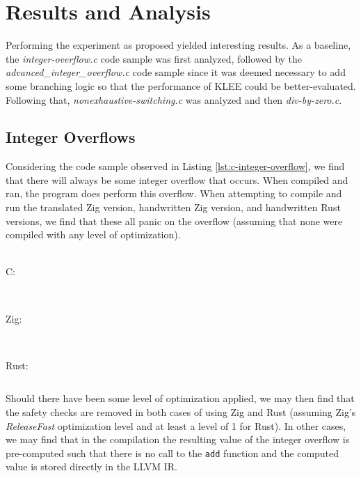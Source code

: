 \documentclass[conference]{IEEEtran}
\newenvironment{code}{\captionsetup{type=listing}}{}
\begin{document}
\section{Results and Analysis}
Performing the experiment as proposed yielded interesting results. As a baseline, the
\textit{integer-overflow.c} code sample was first analyzed, followed by the
\textit{advanced\_integer\_overflow.c} code sample since it was deemed necessary to
add some branching logic so that the performance of KLEE could be better-evaluated.
Following that, \textit{nonexhaustive-switching.c} was analyzed and then
\textit{div-by-zero.c}.


\subsection{Integer Overflows}
Considering the code sample observed in Listing \ref{lst:c-integer-overflow}, we find
that there will always be some integer overflow that occurs. When compiled and ran, the
program does perform this overflow. When attempting to compile and run the translated
Zig version, handwritten Zig version, and handwritten Rust versions, we find that these
all panic on the overflow (assuming that none were compiled with any level of
optimization).

\begin{code}
    \medskip
    \hrulefill\\
    C:
    \inputminted[firstline=6,lastline=19]{llvm}{../code-examples/c/integer-overflow.ll}
    \hrulefill\\
    Zig:
    \inputminted[firstline=148697,lastline=148718]{llvm}{../code-examples/zig/integer_overflow.ll}
    \hrulefill\\
    Rust:
    \inputminted[firstline=129,lastline=145]{llvm}{../code-examples/rust/integer_overflow.ll}
    \label{lst:llvm-integer-overflow}
    \medskip
\end{code}

Should there have been some level of optimization applied, we may then find
that the safety checks are removed in both cases of using Zig and Rust
(assuming Zig's \textit{ReleaseFast} optimization level and at least a level
of 1 for Rust). In other cases, we may find that in the compilation the
resulting value of the integer overflow is pre-computed such that there is
no call to the \texttt{add} function and the computed value is stored
directly in the LLVM IR.
\end{document}
